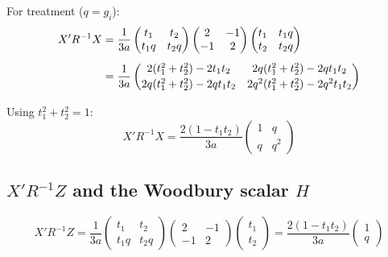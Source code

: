 \documentclass[11pt]{article}
\begin{document}
For treatment ($q = g_i$):
\begin{align}
  X'R^{-1}X
  &= \frac{1}{3a}
    \begin{pmatrix} t_1 & t_2 \\ t_1 q & t_2 q \end{pmatrix}
    \begin{pmatrix} 2&-1\\-1&2 \end{pmatrix}
    \begin{pmatrix} t_1 & t_1 q \\ t_2 & t_2 q \end{pmatrix}
    \notag \\[4pt]
  &= \frac{1}{3a}\begin{pmatrix}
    2(t_1^2 + t_2^2) - 2t_1 t_2 &
    2q(t_1^2 + t_2^2) - 2q t_1 t_2 \\[2pt]
    2q(t_1^2 + t_2^2) - 2q t_1 t_2 &
    2q^2(t_1^2 + t_2^2) - 2q^2 t_1 t_2
  \end{pmatrix}
\end{align}

Using $t_1^2 + t_2^2 = 1$:
\begin{equation}
  X'R^{-1}X = \frac{2(1 - t_1 t_2)}{3a}
  \begin{pmatrix} 1 & q \\ q & q^2 \end{pmatrix}
\end{equation}


\subsection{$X'R^{-1}Z$ and the Woodbury scalar $H$}

\begin{equation}
  X'R^{-1}Z = \frac{1}{3a}
    \begin{pmatrix} t_1 & t_2 \\ t_1 q & t_2 q \end{pmatrix}
    \begin{pmatrix} 2&-1\\-1&2 \end{pmatrix}
    \begin{pmatrix} t_1 \\ t_2 \end{pmatrix}
  = \frac{2(1 - t_1 t_2)}{3a}
    \begin{pmatrix} 1 \\ q \end{pmatrix}
\end{equation}
\end{document}
